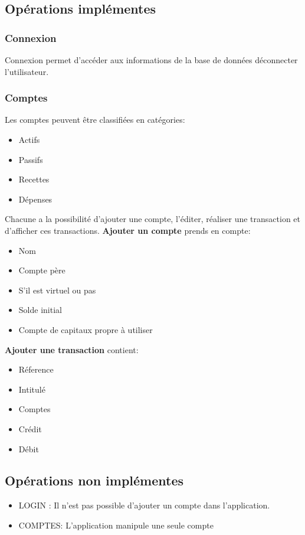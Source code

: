 \documentclass[10pt,a4paper,openany]{report}
\begin{document}
	\subsection{Opérations implémentes}
	
	\subsubsection{Connexion}
	Connexion permet d'accéder aux informations de la base de données déconnecter l'utilisateur.
	
	\subsubsection{Comptes}
	Les comptes peuvent être classifiées en catégories:
	\begin{itemize}
		\item Actifs 
		\item Passifs
		\item Recettes
		\item Dépenses
	\end{itemize}
	
	Chacune a la possibilité d'ajouter une compte, l'éditer, réaliser une transaction et d'afficher ces transactions.
	\textbf{Ajouter un compte} prends en compte:
	\begin{itemize}
		\item Nom 
		\item Compte père
		\item S'il est virtuel ou pas
		\item Solde initial
		\item Compte de capitaux propre à utiliser
	\end{itemize}
	\textbf{Ajouter une transaction} contient:
	\begin{itemize}
		\item Réference
		\item Intitulé
		\item Comptes
		\item Crédit
		\item Débit
	\end{itemize}
	\subsection{Opérations non implémentes}
	\begin{itemize}
		\item LOGIN : Il n'est pas possible d'ajouter un compte dans l'application.
		\item COMPTES: L'application manipule une seule compte

	\end{itemize}
\end{document}
